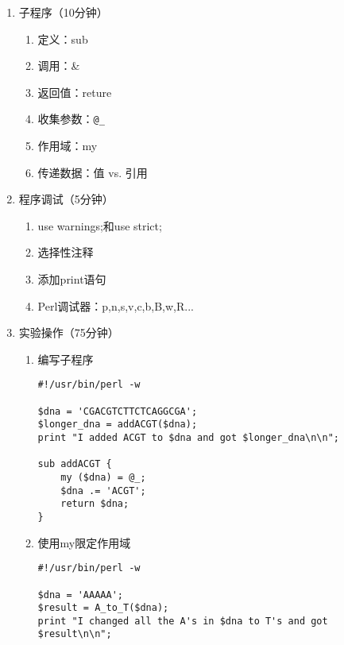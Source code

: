 \documentclass{TIJMUjiaoanSY}
\begin{document}
\firstTail

\newpage
\otherHeader

\begin{enumerate}
  \item 子程序（10分钟）
\vspace*{-1em}
\begin{multicols}{3}
    \begin{enumerate}
      \item 定义：sub
      \item 调用：\&
      \item 返回值：reture
      \item 收集参数：\verb|@_|
      \item 作用域：my
      \item 传递数据：值 vs. 引用
    \end{enumerate}
\end{multicols}
\vspace*{-1em}
  \item 程序调试（5分钟）
\vspace*{-1em}
\begin{multicols}{2}
    \begin{enumerate}
      \item use warnings;和use strict;
      \item 选择性注释
      \item 添加print语句
      \item Perl调试器：p,n,s,v,c,b,B,w,R...
    \end{enumerate}
\end{multicols}
\vspace*{-1em}
  \item 实验操作（75分钟）
    \begin{enumerate}
      \item 编写子程序
\begin{verbatim}
#!/usr/bin/perl -w

$dna = 'CGACGTCTTCTCAGGCGA';
$longer_dna = addACGT($dna);
print "I added ACGT to $dna and got $longer_dna\n\n";

sub addACGT {
    my ($dna) = @_;
    $dna .= 'ACGT';
    return $dna;
}
\end{verbatim}
      \item 使用my限定作用域
\begin{verbatim}
#!/usr/bin/perl -w

$dna = 'AAAAA';
$result = A_to_T($dna);
print "I changed all the A's in $dna to T's and got $result\n\n";


\end{verbatim}
\end{enumerate}
\end{enumerate}
\end{document}
